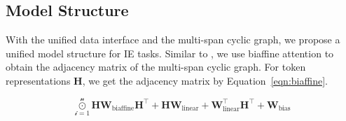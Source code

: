\subsection{Model Structure}

With the unified data interface and the multi-span cyclic graph, we propose a unified model structure for IE tasks.
Similar to \citet{ner-as-dp}, we use biaffine attention to obtain the adjacency matrix of the multi-span cyclic graph.
For token representations $\mathbf{H}$, we get the adjacency matrix by Equation~\ref{eqn:biaffine}.


\begin{equation}
    \label{eqn:biaffine}
    \mathcal{\mathop{\odot}\limits_{i=1}^{n}} \mathbf{H} \mathbf{W}_{\text{biaffine}} \mathbf{H}^{\top} + \mathbf{H} \mathbf{W}_{\text{linear}} + \mathbf{W}_{\text{linear}}^{\top} \mathbf{H}^{\top} + \mathbf{W}_{\text{bias}}
\end{equation}
